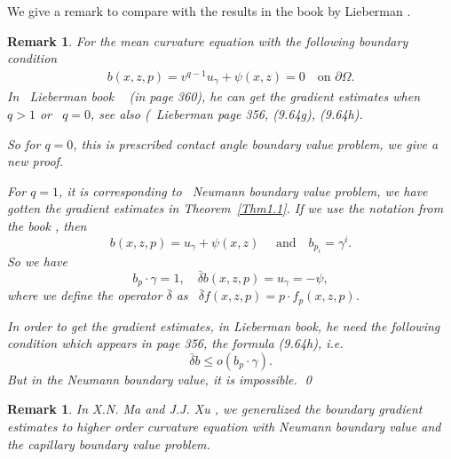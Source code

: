 \documentclass[11pt]{amsart}
\newtheorem{Rem}[Thm]{Remark}
\numberwithin{equation}{section}
\begin{document}
We give a remark to compare with the results in the book by Lieberman \cite{Lieb13}.
\begin{Rem}\label{4Rem4}
For the mean curvature equation with the following boundary condition
\begin{align}\label{5.16}
b(x,z,p)=v^{q-1}u_\gamma+\psi(x,z)=0\quad \text{on} \,\, \partial \Omega.
\end{align}
In ~Lieberman book ~\cite{Lieb13} (in page 360), he can get the gradient estimates when  ~$q>1$ or ~$q=0$, see also (~Lieberman \cite{Lieb13} page 356, (9.64g), (9.64h).

 So for $q=0$, this is  prescribed contact angle boundary value problem, we give a new proof.

For $q=1$, it is corresponding to ~Neumann  boundary value problem,  we have gotten the gradient estimates in Theorem~\ref{Thm1.1}.
If we use the notation from the book \cite{Lieb13}, then
$$b(x,z,p)=u_\gamma+\psi(x,z)\quad \text{ and}\quad  b_{p_i}=\gamma^i. $$
So we have ~$$b_p\cdot\gamma=1, \quad \bar\delta b(x,z,p)=u_\gamma=-\psi,$$ where we define the operator $\bar\delta$ as  ~$\bar\delta f(x,z,p)=p\cdot f_p(x,z,p)$.

In order to get the gradient estimates,  in Lieberman \cite{Lieb13} book, he need the following  condition which appears in  page 356, the formula (9.64h), i.e.
 $$\bar\delta b \leq o(b_p\cdot\gamma).$$
 But in the Neumann boundary value, it is impossible.
 \qed
\end{Rem}


\begin{Rem}\label{4Rem2}
In  X.N. Ma  and J.J. Xu \cite{MX14}, we generalized the boundary gradient estimates to higher order curvature equation with Neumann boundary value and the capillary boundary value problem.
\end{Rem}
\end{document}
